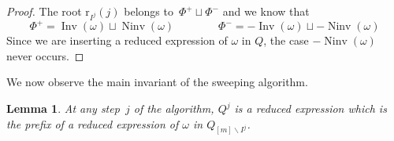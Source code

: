 \documentclass[reqno]{amsart}
\newtheorem{lemma}[theorem]{Lemma}
\theoremstyle{definition}
\newcommand{\ssm}{\smallsetminus} %
\DeclareMathOperator{\Inv}{Inv} %
\DeclareMathOperator{\Ninv}{Ninv} %
\newcommand{\rootFunction}[2]{\mathrm{r}_{#1}(#2)} %
\begin{document}
\begin{proof}
The root $\rootFunction{I^j}{j}$ belongs to~$\Phi^+ \sqcup \Phi^-$ and we know that
\[
\Phi^+ = \Inv(\omega) \sqcup \Ninv(\omega) \qquad \qquad
\Phi^- = -\Inv(\omega) \sqcup -\Ninv(\omega)  
\]
Since we are inserting a reduced expression of $\omega$ in $Q$, the case $-\Ninv(\omega)$ never occurs.
\end{proof}

We now observe the main invariant of the sweeping algorithm.

\begin{lemma}
\label{lem:sweeping2}
At any step~$j$ of the algorithm, $Q^j$ is a reduced expression which is the prefix of a reduced expression of $\omega$ in $Q_{[m]\ssm I^j}$.
\end{lemma}
\end{document}
